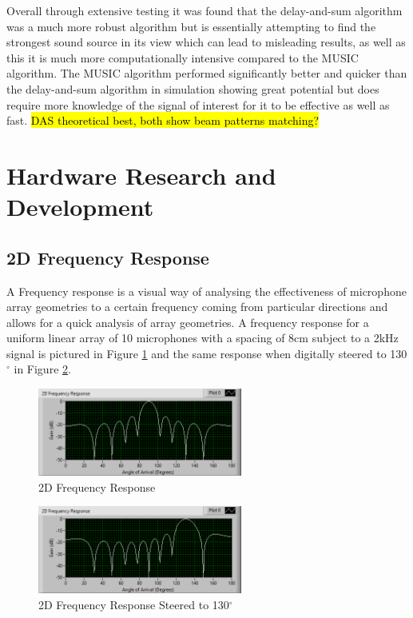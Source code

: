 \documentclass{UoNMCHA}
\numberwithin{equation}{section}
\begin{document}
    Overall through extensive testing it was found that the delay-and-sum algorithm was a much more robust algorithm but is essentially attempting to find the strongest sound source in its view which can lead to misleading results, as well as this it is much more computationally intensive compared to the MUSIC algorithm. The MUSIC algorithm performed significantly better and quicker than the delay-and-sum algorithm in simulation showing great potential but does require more knowledge of the signal of interest for it to be effective as well as fast. \hl{DAS theoretical best, both show beam patterns matching?}
    
\newpage
\section{Hardware Research and Development} \label{sec:Hardware}
\subsection{2D Frequency Response} \label{sec:2D Freq Response}
    A Frequency response is a visual way of analysing the effectiveness of microphone array geometries to a certain frequency coming from particular directions and allows for a quick analysis of array geometries. A frequency response for a uniform linear array of 10 microphones with a spacing of $8$cm subject to a 2kHz signal is pictured in Figure \ref{fig:2DFreqResponseLin} and the same response when digitally steered to 130$^{\circ}$ in Figure \ref{fig:2DResponseSteered}.
    
    \begin{figure}[H]
        \centering
        \includegraphics[keepaspectratio, width = 0.6\textwidth]{Figures/FrequencyResponse2K10Lin.png}
        \caption{2D Frequency Response}
        \label{fig:2DFreqResponseLin}
    \end{figure}
    \begin{figure}[H]
        \centering
        \includegraphics[keepaspectratio, width = 0.6\textwidth]{Figures/2DResponseSteered.png}
        \caption{2D Frequency Response Steered to 130$^{\circ}$}
        \label{fig:2DResponseSteered}
    \end{figure}
    
\end{document}
